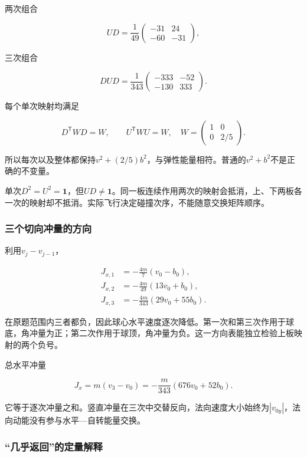 \documentclass[12pt,a4paper,fontset=fandol]{ctexart}
\begin{document}
两次组合

\[
UD=\frac1{49}\begin{pmatrix}-31&24\\-60&-31\end{pmatrix},
\]

三次组合

\[
DUD=\frac1{343}
\begin{pmatrix}-333&-52\\-130&333\end{pmatrix}.
\]

每个单次映射均满足

\[
D^{\mathsf T}WD=W,\qquad
U^{\mathsf T}WU=W,\quad
W=\begin{pmatrix}1&0\\0&2/5\end{pmatrix}.
\]

所以每次以及整体都保持\(v^2+(2/5)b^2\)，与弹性能量相符。普通的\(v^2+b^2\)不是正确的不变量。

单次\(D^2=U^2=\mathbf1\)，但\(UD\neq\mathbf1\)。同一板连续作用两次的映射会抵消，上、下两板各一次的映射却不抵消。实际飞行决定碰撞次序，不能随意交换矩阵顺序。

\subsubsection{三个切向冲量的方向}\label{ux4e09ux4e2aux5207ux5411ux51b2ux91cfux7684ux65b9ux5411}

利用\(v_j-v_{j-1}\)，

\[
\begin{aligned}
J_{x,1}&=-\frac{4m}{7}(v_0-b_0),\\
J_{x,2}&=-\frac{4m}{49}(13v_0+b_0),\\
J_{x,3}&=-\frac{4m}{343}(29v_0+55b_0).
\end{aligned}
\]

在原题范围内三者都负，因此球心水平速度逐次降低。第一次和第三次作用于球底，角冲量为正；第二次作用于球顶，角冲量为负。这一方向表能独立检验上板映射的两个负号。

总水平冲量

\[
J_x=m(v_3-v_0)
=-\frac{m}{343}(676v_0+52b_0).
\]

它等于逐次冲量之和。竖直冲量在三次中交替反向，法向速度大小始终为\(|v_{0y}|\)，法向动能没有参与水平---自转能量交换。

\subsubsection{``几乎返回''的定量解释}\label{ux51e0ux4e4eux8fd4ux56deux7684ux5b9aux91cfux89e3ux91ca}
\end{document}
